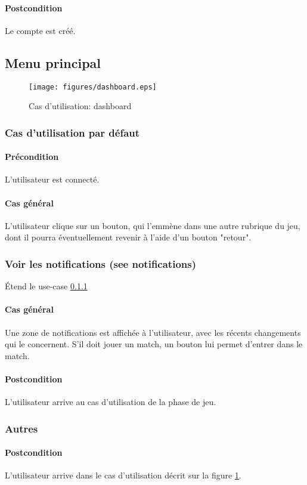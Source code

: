     \paragraph{Postcondition} Le compte est créé.

\subsection{Menu principal}
\begin{figure}[h!]
    \centering
    \texttt{[image: figures/dashboard.eps]}
    \caption{\label{fig:UC:dashboard} Cas d'utilisation: dashboard}
\end{figure}

\subsubsection{Cas d'utilisation par défaut}
    \label{UC:dashboard}
    \paragraph{Précondition} L'\gls{utilisateur} est connecté.
    \paragraph{Cas général} L'utilisateur clique sur un bouton, qui l'emmène dans une autre rubrique du jeu, dont il pourra éventuellement revenir à l'aide d'un bouton "retour".

\subsubsection{Voir les notifications (see notifications)}
    \'Etend le use-case \ref{UC:dashboard}
    \paragraph{Cas général} Une zone de notifications est affichée à l'utilisateur, avec les récents changements qui le concernent. S'il doit jouer un match, un bouton lui permet d'entrer dans le match.
    \paragraph{Postcondition} L'utilisateur arrive au cas d'utilisation de la phase de jeu.

\subsubsection{Autres}
    \paragraph{Postcondition} L'utilisateur arrive dans le cas d'utilisation décrit sur la figure \ref{fig:UC:dashboard}.

